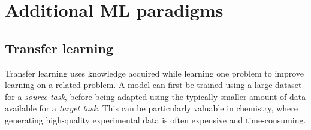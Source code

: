 \section{Additional ML paradigms}


\subsection{Transfer learning}

Transfer learning uses knowledge acquired while learning one problem to improve learning on a related problem.
A model can first be trained using a large dataset for a \textit{source task}, before being adapted using the typically smaller amount of data available for a \textit{target task}.
This can be particularly valuable in chemistry, where generating high-quality experimental data is often expensive and time-consuming.

